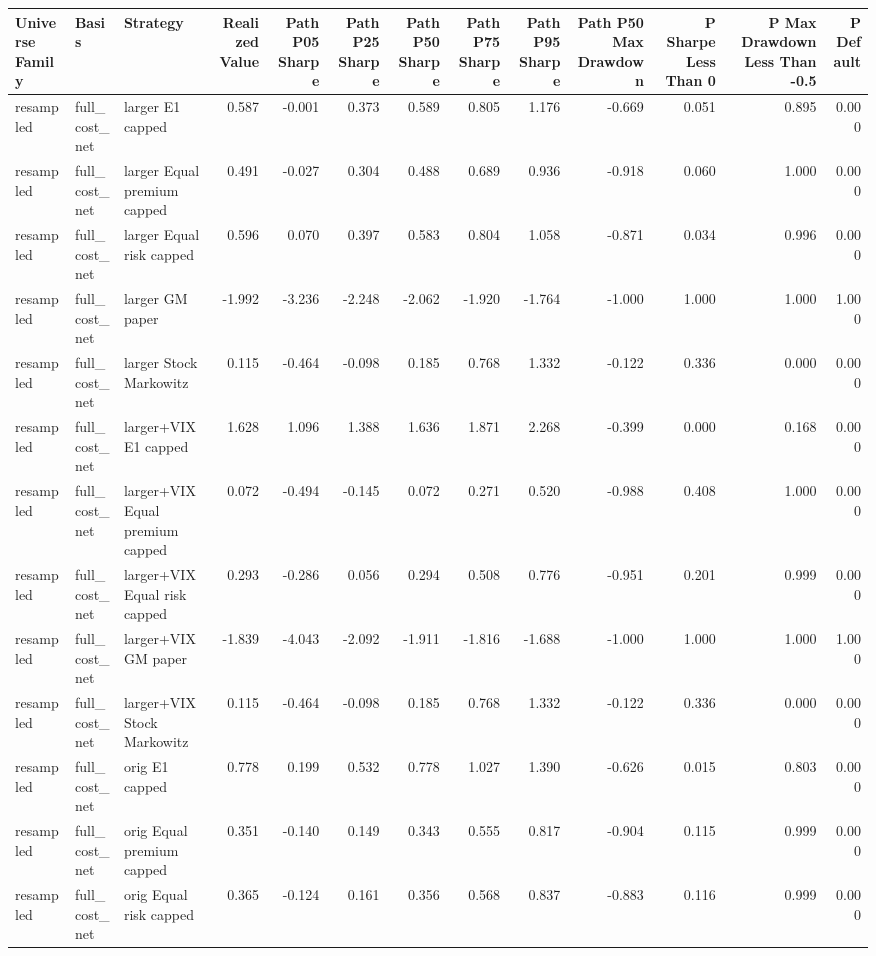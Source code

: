 \begin{tabular}{lllrrrrrrrrrr}
\toprule
Universe Family & Basis & Strategy & Realized Value & Path P05 Sharpe & Path P25 Sharpe & Path P50 Sharpe & Path P75 Sharpe & Path P95 Sharpe & Path P50 Max Drawdown & P Sharpe Less Than 0 & P Max Drawdown Less Than -0.5 & P Default \\
\midrule
resampled & full\_cost\_net & larger E1 capped & 0.587 & -0.001 & 0.373 & 0.589 & 0.805 & 1.176 & -0.669 & 0.051 & 0.895 & 0.000 \\
resampled & full\_cost\_net & larger Equal premium capped & 0.491 & -0.027 & 0.304 & 0.488 & 0.689 & 0.936 & -0.918 & 0.060 & 1.000 & 0.000 \\
resampled & full\_cost\_net & larger Equal risk capped & 0.596 & 0.070 & 0.397 & 0.583 & 0.804 & 1.058 & -0.871 & 0.034 & 0.996 & 0.000 \\
resampled & full\_cost\_net & larger GM paper & -1.992 & -3.236 & -2.248 & -2.062 & -1.920 & -1.764 & -1.000 & 1.000 & 1.000 & 1.000 \\
resampled & full\_cost\_net & larger Stock Markowitz & 0.115 & -0.464 & -0.098 & 0.185 & 0.768 & 1.332 & -0.122 & 0.336 & 0.000 & 0.000 \\
resampled & full\_cost\_net & larger+VIX E1 capped & 1.628 & 1.096 & 1.388 & 1.636 & 1.871 & 2.268 & -0.399 & 0.000 & 0.168 & 0.000 \\
resampled & full\_cost\_net & larger+VIX Equal premium capped & 0.072 & -0.494 & -0.145 & 0.072 & 0.271 & 0.520 & -0.988 & 0.408 & 1.000 & 0.000 \\
resampled & full\_cost\_net & larger+VIX Equal risk capped & 0.293 & -0.286 & 0.056 & 0.294 & 0.508 & 0.776 & -0.951 & 0.201 & 0.999 & 0.000 \\
resampled & full\_cost\_net & larger+VIX GM paper & -1.839 & -4.043 & -2.092 & -1.911 & -1.816 & -1.688 & -1.000 & 1.000 & 1.000 & 1.000 \\
resampled & full\_cost\_net & larger+VIX Stock Markowitz & 0.115 & -0.464 & -0.098 & 0.185 & 0.768 & 1.332 & -0.122 & 0.336 & 0.000 & 0.000 \\
resampled & full\_cost\_net & orig E1 capped & 0.778 & 0.199 & 0.532 & 0.778 & 1.027 & 1.390 & -0.626 & 0.015 & 0.803 & 0.000 \\
resampled & full\_cost\_net & orig Equal premium capped & 0.351 & -0.140 & 0.149 & 0.343 & 0.555 & 0.817 & -0.904 & 0.115 & 0.999 & 0.000 \\
resampled & full\_cost\_net & orig Equal risk capped & 0.365 & -0.124 & 0.161 & 0.356 & 0.568 & 0.837 & -0.883 & 0.116 & 0.999 & 0.000 \\

\end{tabular}

